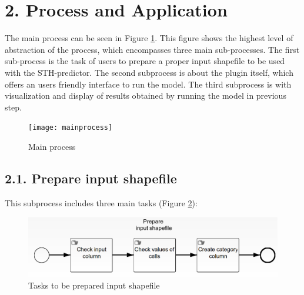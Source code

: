 \documentclass[12pt,oneside]{memoir}
\begin{document}
\section*{2. Process and Application}
The main process can be seen in Figure \ref{mainprocess}. This figure shows the highest level of abstraction of the process, which encompasses three main sub-processes. The first sub-process is the task of users to prepare a proper input shapefile to be used with the STH-predictor. The second subprocess is about the plugin itself, which offers an users friendly interface to run the model. The third subprocess is with visualization and display of results obtained by running the model in previous step.

\begin{figure}[H]
\centering
\texttt{[image: mainprocess]} 
\caption{Main process} 
\label{mainprocess}
\end{figure}

\subsection{2.1. Prepare input shapefile}
This subprocess includes three main tasks (Figure \ref{input}):
\begin{figure}[H]
\centering
\includegraphics[scale=0.4]{input} 
\caption{Tasks to be prepared input shapefile} 
\label{input}
\end{figure}
\end{document}
